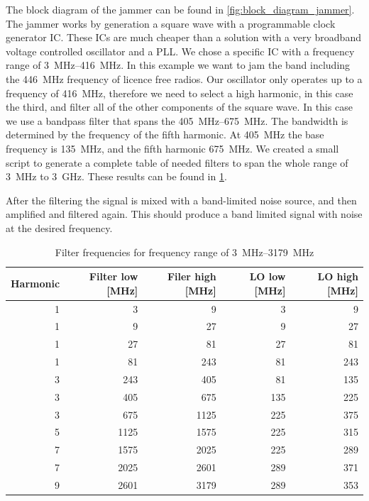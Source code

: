 \documentclass[a4paper, openany, oneside]{memoir}
\begin{document}
The block diagram of the jammer can be found in \cref{fig:block_diagram_jammer}. The jammer works by generation a square wave with a programmable clock generator IC\@. These ICs are much cheaper than a solution with a very broadband voltage controlled oscillator and a PLL\@. We chose a specific IC with a frequency range of \SIrange{3}{416}{\mega\hertz}. In this example we want to jam the band including the \SI{446}{\mega\hertz} frequency of licence free radios. Our oscillator only operates up to a frequency of \SI{416}{\mega\hertz}, therefore we need to select a high harmonic, in this case the third, and filter all of the other components of the square wave. In this case we use a bandpass filter that spans the \SIrange{405}{675}{\mega\hertz}. The bandwidth is determined by the frequency of the fifth harmonic. At \SI{405}{\mega\hertz} the base frequency is \SI{135}{\mega\hertz}, and the fifth harmonic \SI{675}{\mega\hertz}. We created a small script to generate a complete table of needed filters to span the whole range of \SI{3}{\mega\hertz} to \SI{3}{\giga\hertz}. These results can be found in \cref{tab:filter_freqs}.

After the filtering the signal is mixed with a band-limited noise source, and then amplified and filtered again. This should produce a band limited signal with noise at the desired frequency.

\begin{table}[h]
\centering
\caption{Filter frequencies for frequency range of \SIrange{3}{3179}{\mega\hertz}}
\label{tab:filter_freqs}
\begin{adjustbox}{max width=\textwidth}
\begin{tabular}{rrrrr}
\toprule
   Harmonic &   Filter low [\si{\mega\hertz}] &   Filer high [\si{\mega\hertz}] &   LO low [\si{\mega\hertz}] &   LO high [\si{\mega\hertz}] \\
\midrule
          1 &            3 &            9 &        3 &         9 \\
          1 &            9 &           27 &        9 &        27 \\
          1 &           27 &           81 &       27 &        81 \\
          1 &           81 &          243 &       81 &       243 \\
          3 &          243 &          405 &       81 &       135 \\
          3 &          405 &          675 &      135 &       225 \\
          3 &          675 &         1125 &      225 &       375 \\
          5 &         1125 &         1575 &      225 &       315 \\
          7 &         1575 &         2025 &      225 &       289 \\
          7 &         2025 &         2601 &      289 &       371 \\
          9 &         2601 &         3179 &      289 &       353 \\
\bottomrule
\end{tabular}
\end{adjustbox}
\end{table}
\end{document}
